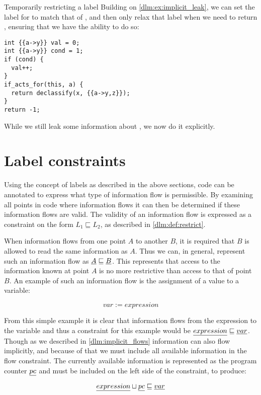 \begin{example}{Temporarily restricting a label}
  Building on \cref{dlm:ex:implicit_leak}, we can set the label for  to match that of , and then only relax that label when we need to return , ensuring that we have the ability to do so:
  \begin{lstlisting}[style=dlmc]
int {{a->y}} val = 0;
int {{a->y}} cond = 1;
if (cond) {
  val++;
}
if_acts_for(this, a) {
  return declassify(x, {{a->y,z}});
}
return -1;
  \end{lstlisting}
  While we still leak some information about , we now do it explicitly.
\end{example}

\section{Label constraints}\label{dlm:constraints}
Using the concept of labels as described in the above sections, code can be annotated to express what type of information flow is permissible.
By examining all points in code where information flows it can then be determined if these information flows are valid.
The validity of an information flow is expressed as a constraint on the form $L_1 \sqsubseteq L_2$, as described in \cref{dlm:def:restrict}.

When information flows from one point $A$ to another $B$, it is required that $B$ is allowed to read the same information as $A$.
Thus we can, in general, represent such an information flow as $\underline{A} \sqsubseteq \underline{B}$.
This represents that access to the information known at point $A$ is no more restrictive than access to that of point $B$.
An example of such an information flow is the assignment of a value to a variable:

$$var := expression$$

From this simple example it is clear that information flows from the expression to the variable and thus a constraint for this example would be $\underline{expression} \sqsubseteq \underline{var}$.
Though as we described in \cref{dlm:implicit_flows} information can also flow implicitly, and because of that we must include all available information in the flow constraint.
The currently available information is represented as the program counter $\underline{pc}$ and must be included on the left side of the constraint, to produce:

$$\underline{expression} \sqcup \underline{pc} \sqsubseteq \underline{var}$$

